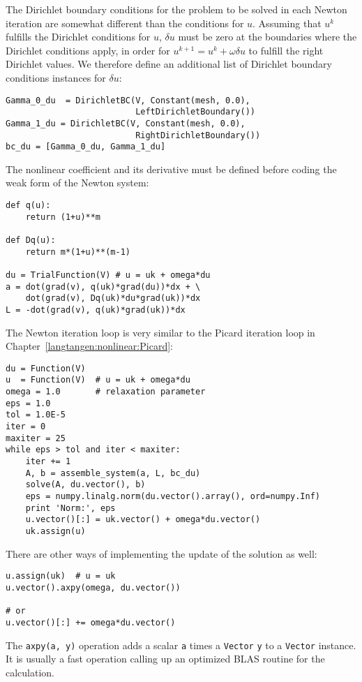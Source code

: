 The Dirichlet boundary conditions for the problem to be solved in each Newton
iteration are somewhat different than the conditions for $u$. 
Assuming that $u^k$ fulfills the
Dirichlet conditions for $u$, $\delta u$ must be zero at the boundaries 
where the Dirichlet conditions apply, in order for $u^{k+1}=u^k + \omega\delta u$ to fulfill
the right Dirichlet values. We therefore define an additional list of
Dirichlet boundary conditions instances for $\delta u$:
\begin{Verbatim}[fontsize=\fontsize{10pt}{10pt},tabsize=8,baselinestretch=1.05,
fontfamily=tt,xleftmargin=7mm]
Gamma_0_du  = DirichletBC(V, Constant(mesh, 0.0),
                          LeftDirichletBoundary())
Gamma_1_du = DirichletBC(V, Constant(mesh, 0.0),
                          RightDirichletBoundary())
bc_du = [Gamma_0_du, Gamma_1_du]
\end{Verbatim}
\noindent
The nonlinear coefficient and its derivative must be defined
before coding the weak form of the Newton system:
\begin{Verbatim}[fontsize=\fontsize{10pt}{10pt},tabsize=8,baselinestretch=1.05,
fontfamily=tt,xleftmargin=7mm]
def q(u):
    return (1+u)**m

def Dq(u):
    return m*(1+u)**(m-1)

du = TrialFunction(V) # u = uk + omega*du
a = dot(grad(v), q(uk)*grad(du))*dx + \
    dot(grad(v), Dq(uk)*du*grad(uk))*dx
L = -dot(grad(v), q(uk)*grad(uk))*dx
\end{Verbatim}
\noindent

The Newton iteration loop is very similar to the Picard iteration loop
in Chapter~\ref{langtangen:nonlinear:Picard}:
\begin{Verbatim}[fontsize=\fontsize{10pt}{10pt},tabsize=8,baselinestretch=1.05,
fontfamily=tt,xleftmargin=7mm]
du = Function(V)
u  = Function(V)  # u = uk + omega*du
omega = 1.0       # relaxation parameter
eps = 1.0
tol = 1.0E-5
iter = 0
maxiter = 25
while eps > tol and iter < maxiter:
    iter += 1
    A, b = assemble_system(a, L, bc_du)
    solve(A, du.vector(), b)
    eps = numpy.linalg.norm(du.vector().array(), ord=numpy.Inf)
    print 'Norm:', eps
    u.vector()[:] = uk.vector() + omega*du.vector()
    uk.assign(u)
\end{Verbatim}
\noindent
There are other ways of implementing the
update of the solution as well:
\begin{Verbatim}[fontsize=\fontsize{10pt}{10pt},tabsize=8,baselinestretch=1.05,
fontfamily=tt,xleftmargin=7mm]
u.assign(uk)  # u = uk
u.vector().axpy(omega, du.vector())

# or
u.vector()[:] += omega*du.vector()
\end{Verbatim}
\noindent
The {\fontsize{12pt}{12pt}\texttt{axpy(a, y)}} operation adds a scalar {\fontsize{12pt}{12pt}\texttt{a}} times a {\fontsize{12pt}{12pt}\texttt{Vector}}
{\fontsize{12pt}{12pt}\texttt{y}} to a {\fontsize{12pt}{12pt}\texttt{Vector}} instance.  It is usually a fast operation
calling up an optimized BLAS routine for the calculation.

